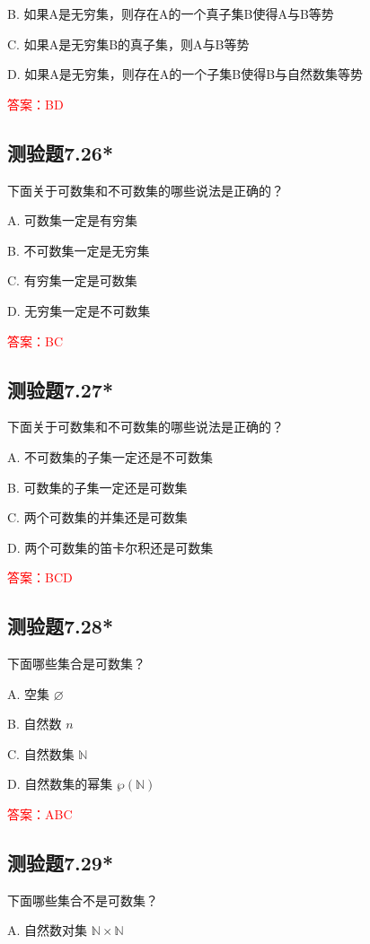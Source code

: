 \documentclass[UTF8, heading=true]{ctexart}
\begin{document}
B. 如果A是无穷集，则存在A的一个真子集B使得A与B等势

C. 如果A是无穷集B的真子集，则A与B等势

D. 如果A是无穷集，则存在A的一个子集B使得B与自然数集等势

\textcolor{red}{答案：BD}


\subsection{测验题7.26*}

下面关于可数集和不可数集的哪些说法是正确的？

A. 可数集一定是有穷集

B. 不可数集一定是无穷集

C. 有穷集一定是可数集

D. 无穷集一定是不可数集

\textcolor{red}{答案：BC}

\subsection{测验题7.27*}

下面关于可数集和不可数集的哪些说法是正确的？

A. 不可数集的子集一定还是不可数集

B. 可数集的子集一定还是可数集

C. 两个可数集的并集还是可数集

D. 两个可数集的笛卡尔积还是可数集

\textcolor{red}{答案：BCD}

\subsection{测验题7.28*}

下面哪些集合是可数集？

A. 空集 $\varnothing$

B. 自然数 $n$

C. 自然数集 $\mathbb{N}$

D. 自然数集的幂集 $\wp(\mathbb{N})$

\textcolor{red}{答案：ABC}

\subsection{测验题7.29*}

下面哪些集合不是可数集？

A. 自然数对集 $\mathbb{N} \times \mathbb{N}$
\end{document}
